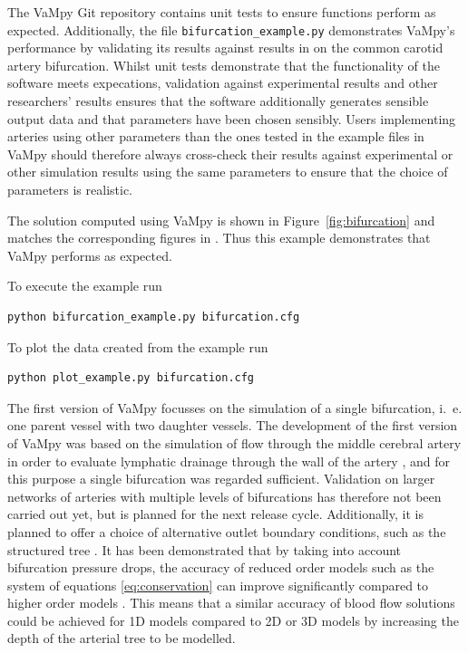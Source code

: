 \documentclass{jors}
\begin{document}
The VaMpy Git repository contains unit tests to ensure functions perform as expected. Additionally, the file \texttt{bifurcation\_example.py} demonstrates VaMpy's performance by validating its results against results in \cite{Kolachalama2007} on the common carotid artery bifurcation. Whilst unit tests demonstrate that the functionality of the software meets expecations, validation against experimental results and other researchers' results ensures that the software additionally generates sensible output data and that parameters have been chosen sensibly. Users implementing arteries using other parameters than the ones tested in the example files in VaMpy should therefore always cross-check their results against experimental or other simulation results using the same parameters to ensure that the choice of parameters is realistic.

The solution computed using VaMpy is shown in Figure~\ref{fig:bifurcation} and matches the corresponding figures in \cite{Kolachalama2007}. Thus this example demonstrates that VaMpy performs as expected.

To execute the example run
\begin{verbatim}
python bifurcation_example.py bifurcation.cfg
\end{verbatim}
To plot the data created from the example run
\begin{verbatim}
python plot_example.py bifurcation.cfg
\end{verbatim}

The first version of VaMpy focusses on the simulation of a single bifurcation, i.~e. one parent vessel with two daughter vessels. The development of the first version of VaMpy was based on the simulation of flow through the middle cerebral artery in order to evaluate lymphatic drainage through the wall of the artery \cite{Diem2016a}, and for this purpose a single bifurcation was regarded sufficient. Validation on larger networks of arteries with multiple levels of bifurcations has therefore not been carried out yet, but is planned for the next release cycle. Additionally, it is planned to offer a choice of alternative outlet boundary conditions, such as the structured tree \cite{Olufsen2000,Cousins2014}. It has been demonstrated that by taking into account bifurcation pressure drops, the accuracy of reduced order models such as the system of equations \eqref{eq:conservation} can improve significantly compared to higher order models \cite{Chnafa2016}. This means that a similar accuracy of blood flow solutions could be achieved for 1D models compared to 2D or 3D models by increasing the depth of the arterial tree to be modelled.
\end{document}
